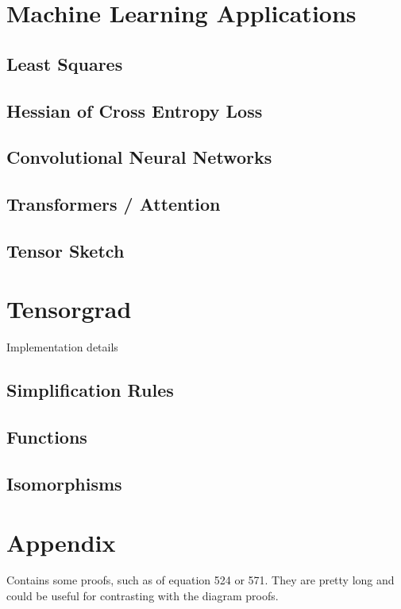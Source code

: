 \documentclass[oneside]{book}
\begin{document}
\chapter{Machine Learning Applications}

\section{Least Squares}

\section{Hessian of Cross Entropy Loss}

\section{Convolutional Neural Networks}

\section{Transformers / Attention}

\section{Tensor Sketch}

\chapter{Tensorgrad}

Implementation details

\section{Simplification Rules}
\section{Functions}
\section{Isomorphisms}

\chapter{Appendix}
Contains some proofs, such as of equation 524 or 571.
They are pretty long and could be useful for contrasting with the diagram proofs.
\end{document}
